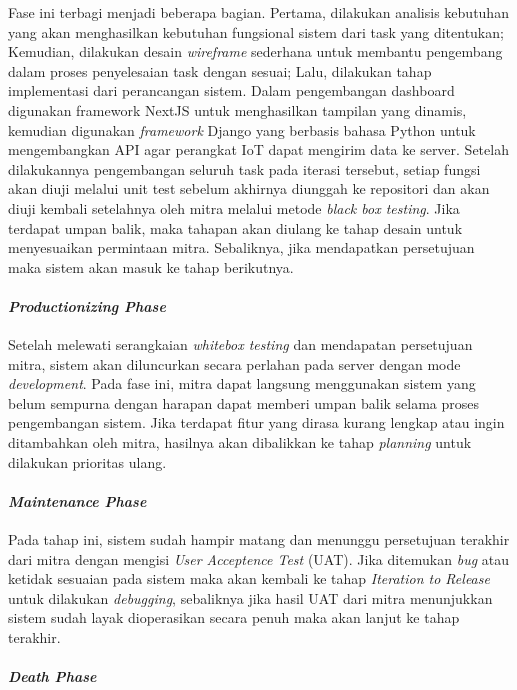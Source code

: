     Fase ini terbagi menjadi beberapa bagian. Pertama, dilakukan analisis kebutuhan yang akan menghasilkan kebutuhan fungsional sistem dari task yang ditentukan; Kemudian, dilakukan desain \textit{wireframe} sederhana untuk membantu pengembang dalam proses penyelesaian task dengan sesuai; Lalu, dilakukan tahap implementasi dari perancangan sistem. Dalam pengembangan dashboard digunakan framework NextJS untuk menghasilkan tampilan yang dinamis, kemudian digunakan \textit{framework} Django yang berbasis bahasa Python untuk mengembangkan API agar perangkat IoT dapat mengirim data ke server. Setelah dilakukannya pengembangan seluruh task pada iterasi tersebut, setiap fungsi akan diuji melalui unit test sebelum akhirnya diunggah ke repositori dan akan diuji kembali setelahnya oleh mitra melalui metode \textit{black box testing}. Jika terdapat umpan balik, maka tahapan akan diulang ke tahap desain untuk menyesuaikan permintaan mitra. Sebaliknya, jika mendapatkan persetujuan maka sistem akan masuk ke tahap berikutnya.

    \paragraph{\textit{Productionizing Phase}}

    Setelah melewati serangkaian \textit{whitebox testing} dan mendapatan persetujuan mitra, sistem akan diluncurkan secara perlahan pada server dengan mode \textit{development}. Pada fase ini, mitra dapat langsung menggunakan sistem yang belum sempurna dengan harapan dapat memberi umpan balik selama proses pengembangan sistem. Jika terdapat fitur yang dirasa kurang lengkap atau ingin ditambahkan oleh mitra, hasilnya akan dibalikkan ke tahap \textit{planning} untuk dilakukan prioritas ulang.

    \paragraph{\textit{Maintenance Phase}}

    Pada tahap ini, sistem sudah hampir matang dan menunggu persetujuan terakhir dari mitra dengan mengisi \textit{User Acceptence Test} (UAT). Jika ditemukan \textit{bug} atau ketidak sesuaian pada sistem maka akan kembali ke tahap \textit{Iteration to Release} untuk dilakukan \textit{debugging}, sebaliknya jika hasil UAT dari mitra menunjukkan sistem sudah layak dioperasikan secara penuh maka akan lanjut ke tahap terakhir.


    \paragraph{\textit{Death Phase}}

